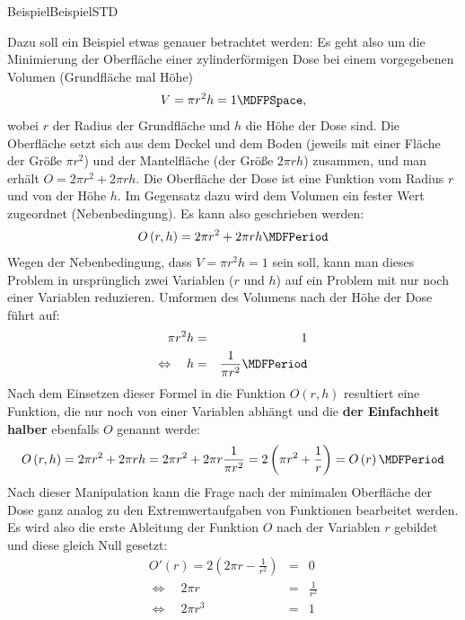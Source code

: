 \begin{MXContent}{Beispiel}{Beispiel}{STD}

Dazu soll ein Beispiel etwas genauer betrachtet werden: Es geht also um die Minimierung der Oberfläche einer zylinderförmigen Dose bei einem vorgegebenen Volumen %
(Grundfläche mal Höhe)
%
\begin{eqnarray*}
V = \pi r^2 h = 1 \MDFPSpace,
\end{eqnarray*}
%
wobei $r$ der Radius der Grundfläche und $h$ die Höhe der Dose sind. Die Oberfläche setzt sich aus dem Deckel und dem Boden
(jeweils mit einer Fläche der Größe $\pi r^2$) und der Mantelfläche (der Größe $2 \pi r h$) zusammen,
und man erhält $O = 2 \pi r^2 + 2 \pi r h$. Die Oberfläche der Dose ist eine Funktion vom Radius $r$ und von der Höhe $h$.
Im Gegensatz dazu wird dem Volumen ein fester Wert zugeordnet (Nebenbedingung). Es kann also geschrieben werden:
%
\begin{eqnarray*}
O\left(r, h\right) = 2 \pi r^2 + 2 \pi r h \MDFPeriod
\end{eqnarray*}
%
Wegen der Nebenbedingung, dass $V = \pi r^2 h = 1$ sein soll, kann man dieses Problem in ursprünglich zwei Variablen ($r$ und $h$)
auf ein Problem mit nur noch einer Variablen reduzieren. Umformen des Volumens nach der Höhe der Dose führt auf:
%
\begin{eqnarray*}
\pi r^2 h &=& 1\\
\Leftrightarrow\quad h &=& \frac{1}{\pi r^2} \MDFPeriod
\end{eqnarray*}
%
Nach dem Einsetzen dieser Formel in die Funktion $O(r,h)$ resultiert eine Funktion, die nur noch von einer Variablen abhängt und die \textbf{der
 Einfachheit halber} ebenfalls $O$ genannt werde:
%
\begin{eqnarray*}
O\left(r, h\right) = 2 \pi r^2 + 2 \pi r h = 2 \pi r^2 + 2 \pi r \frac{1}{\pi r^2} = 2 \left(\pi r^2 + \frac{1}{r}\right) = O\left(r\right) \MDFPeriod
\end{eqnarray*}
%
Nach dieser Manipulation kann die Frage nach der minimalen Oberfläche der Dose ganz analog zu den Extremwertaufgaben von Funktionen bearbeitet werden.
Es wird also die erste Ableitung der Funktion $O$ nach der Variablen $r$ gebildet und diese gleich Null gesetzt:
%
\begin{eqnarray*}
O'\left(r\right) = 2 \left(2\pi r - \frac{1}{r^2}\right) &=& 0\\
\Leftrightarrow\quad 2\pi r &=& \frac{1}{r^2}\\
\Leftrightarrow\quad 2\pi r^3 &=& 1\\

\end{eqnarray*}
\end{MXContent}
